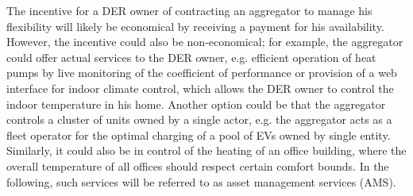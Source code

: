 The incentive for a DER owner of contracting an aggregator to manage his flexibility will likely be economical by receiving a payment for his availability. However, the incentive could also be non-economical; for example, the aggregator could offer actual services to the DER owner, e.g. efficient operation of heat pumps by live monitoring of the coefficient of performance or provision of a web interface for indoor climate control, which allows the DER owner to control the indoor temperature in his home. Another option could be that the aggregator controls a cluster of units owned by a single actor, e.g. the aggregator acts as a fleet operator for the optimal charging of a pool of EVs owned by single entity. Similarly, it could also be in control of the heating of an office building, where the overall temperature of all offices should respect certain comfort bounds. In the following, such services will be referred to as asset management services (AMS). %

%

